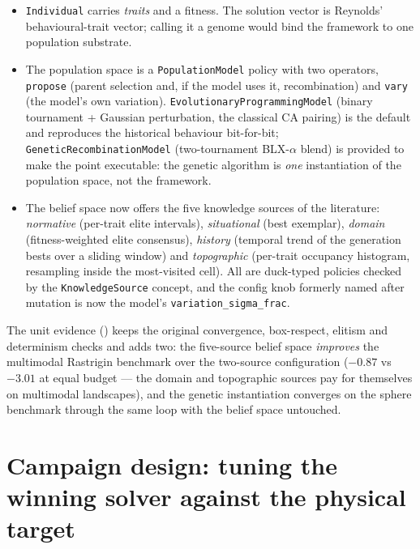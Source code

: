 \begin{itemize}
  \item \texttt{Individual} carries \emph{traits} and a fitness. The
        solution vector is Reynolds' behavioural-trait vector; calling
        it a genome would bind the framework to one population
        substrate.
  \item The population space is a \texttt{PopulationModel} policy with
        two operators, \texttt{propose} (parent selection and, if the
        model uses it, recombination) and \texttt{vary} (the model's
        own variation). \texttt{EvolutionaryProgrammingModel} (binary
        tournament + Gaussian perturbation, the classical CA pairing)
        is the default and reproduces the historical behaviour
        bit-for-bit; \texttt{GeneticRecombinationModel}
        (two-tournament BLX-$\alpha$ blend) is provided to make the
        point executable: the genetic algorithm is \emph{one}
        instantiation of the population space, not the framework.
  \item The belief space now offers the five knowledge sources of the
        literature: \emph{normative} (per-trait elite intervals),
        \emph{situational} (best exemplar), \emph{domain}
        (fitness-weighted elite consensus), \emph{history} (temporal
        trend of the generation bests over a sliding window) and
        \emph{topographic} (per-trait occupancy histogram, resampling
        inside the most-visited cell). All are duck-typed policies
        checked by the \texttt{KnowledgeSource} concept, and the
        config knob formerly named after mutation is now the model's
        \texttt{variation\_sigma\_frac}.
\end{itemize}

The unit evidence ()
keeps the original convergence, box-respect, elitism and determinism
checks and adds two: the five-source belief space \emph{improves} the
multimodal Rastrigin benchmark over the two-source configuration
($-0.87$ vs $-3.01$ at equal budget --- the domain and topographic
sources pay for themselves on multimodal landscapes), and the genetic
instantiation converges on the sphere benchmark through the same loop
with the belief space untouched.

\section{Campaign design: tuning the winning solver against the
physical target}
\label{sec:ca-campaigns}

